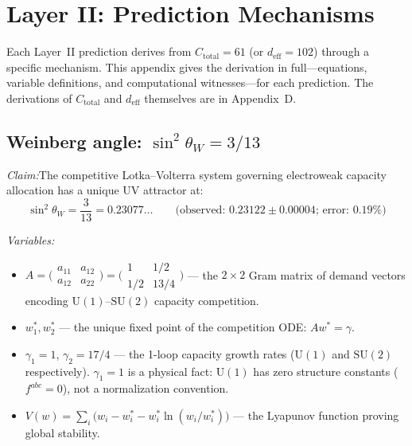 \documentclass[11pt]{article}
\newcommand{\Ctot}{C_{\mathrm{total}}}
\newcommand{\deff}{d_{\mathrm{eff}}}
\newcommand{\sw}{\sin^2\!\theta_W}
\newcommand{\SU}{\mathrm{SU}}
\newcommand{\U}{\mathrm{U}}
\begin{document}
\section{Layer II: Prediction Mechanisms}

Each Layer~II prediction derives from $\Ctot = 61$ (or $\deff = 102$) through a specific mechanism.  This appendix gives the derivation in full---equations, variable definitions, and computational witnesses---for each prediction.  The derivations of $\Ctot$ and $\deff$ themselves are in Appendix~D.

\subsection{Weinberg angle: \texorpdfstring{$\sin^2\!\theta_W = 3/13$}{sin²θW = 3/13}}

\begin{tcolorbox}[apfbox, title={T21b: Lyapunov Stability of the Weak Mixing Angle}]
\textit{Claim:}\quad The competitive Lotka--Volterra system governing electroweak capacity allocation has a unique UV attractor at:
\begin{equation}
\sw = \frac{3}{13} = 0.23077\ldots \qquad\text{(observed: } 0.23122 \pm 0.00004\text{; error: 0.19\%)}
\end{equation}

\smallskip\noindent\textit{Variables:}
\begin{itemize}[nosep,leftmargin=2em]
\item $A = \bigl(\begin{smallmatrix} a_{11} & a_{12} \\ a_{12} & a_{22} \end{smallmatrix}\bigr) = \bigl(\begin{smallmatrix} 1 & 1/2 \\ 1/2 & 13/4 \end{smallmatrix}\bigr)$ --- the $2 \times 2$ Gram matrix of demand vectors encoding $\U(1)$--$\SU(2)$ capacity competition.
\item $w_1^*, w_2^*$ --- the unique fixed point of the competition ODE: $Aw^* = \gamma$.
\item $\gamma_1 = 1$, $\gamma_2 = 17/4$ --- the 1-loop capacity growth rates ($\U(1)$ and $\SU(2)$ respectively).  $\gamma_1 = 1$ is a physical fact: $\U(1)$ has zero structure constants ($f^{abc} = 0$), not a normalization convention.
\item $V(w) = \sum_i \bigl(w_i - w_i^* - w_i^* \ln(w_i/w_i^*)\bigr)$ --- the Lyapunov function proving global stability.
\end{itemize}
\end{tcolorbox}
\end{document}
